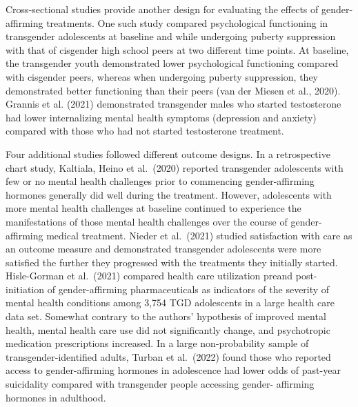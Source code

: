 \documentclass[
]{book}
\begin{document}
Cross-sectional studies provide another design
for evaluating the effects of gender-affirming
treatments. One such study compared psychological functioning in transgender adolescents at
baseline and while undergoing puberty suppression with that of cisgender high school peers at
two different time points. At baseline, the transgender youth demonstrated lower psychological
functioning compared with cisgender peers,
whereas when undergoing puberty suppression,
they demonstrated better functioning than their
peers (van der Miesen et al., 2020). Grannis et al.
(2021) demonstrated transgender males who
started testosterone had lower internalizing mental health symptoms (depression and anxiety)
compared with those who had not started testosterone treatment.

Four additional studies followed different outcome designs. In a retrospective chart study,
Kaltiala, Heino et al.~(2020) reported transgender
adolescents with few or no mental health challenges prior to commencing gender-affirming
hormones generally did well during the treatment. However, adolescents with more mental
health challenges at baseline continued to experience the manifestations of those mental health
challenges over the course of gender-affirming
medical treatment. Nieder et al.~(2021) studied
satisfaction with care as an outcome measure and
demonstrated transgender adolescents were more
satisfied the further they progressed with the
treatments they initially started. Hisle-Gorman
et al.~(2021) compared health care utilization preand post-initiation of gender-affirming pharmaceuticals as indicators of the severity of mental
health conditions among 3,754 TGD adolescents
in a large health care data set. Somewhat contrary
to the authors' hypothesis of improved mental
health, mental health care use did not significantly change, and psychotropic medication prescriptions increased. In a large non-probability
sample of transgender-identified adults, Turban
et al.~(2022) found those who reported access to
gender-affirming hormones in adolescence had
lower odds of past-year suicidality compared with
transgender people accessing gender- affirming
hormones in adulthood.
\end{document}
